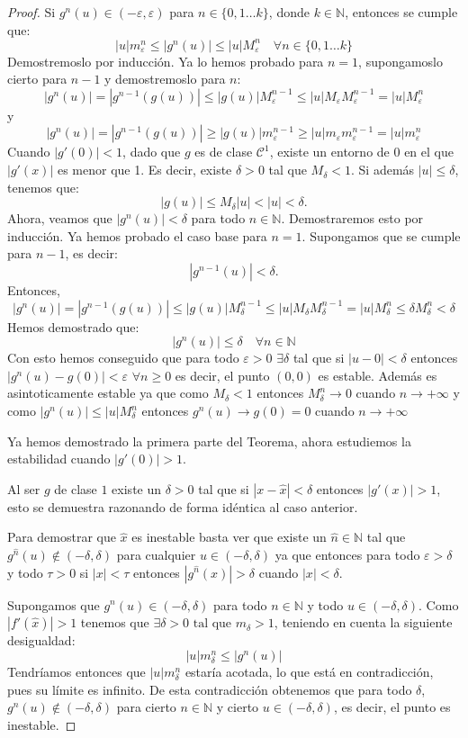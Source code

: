 \documentclass[12pt,a4paper]{report}
\theoremstyle{definition}
\begin{document}
\begin{proof}
Si $g^n(u) \in (-\varepsilon,\varepsilon)$ para $n \in \{0,1 \ldots k\}$, donde $k \in \mathbb{N}$, entonces se cumple que:
$$
|u|  m^n_\varepsilon \leq |g^n(u)| \leq  |u|  M^n_\varepsilon \quad \forall n \in \{0,1 \ldots k\}
$$
%
Demostremoslo por inducción. Ya lo hemos probado para $n = 1$, supongamoslo cierto para $n-1$ y demostremoslo para $n$:
$$|g^n(u)| = |g^{n-1}(g(u))| \leq |g(u)|M_\varepsilon^{n-1} \leq |u|M_\varepsilon M_\varepsilon^{n-1} = |u| M_\varepsilon^{n}$$
y
%
$$|g^n(u)| = |g^{n-1}(g(u))| \geq |g(u)|m_\varepsilon^{n-1} \geq |u|m_\varepsilon m_\varepsilon^{n-1} = |u| m_\varepsilon^{n}$$
%
Cuando \( |g'(0)| < 1 \), dado que \( g \) es de clase \( \mathcal{C}^1 \), existe un entorno de \( 0 \) en el que \( |g'(x)| \) es menor que 1. Es decir, existe \( \delta > 0 \) tal que \( M_\delta < 1 \). Si además \( |u| \leq \delta \), tenemos que:
\[
|g(u)| \leq M_\delta |u| < |u| < \delta.
\]
%
Ahora, veamos que \( |g^n(u)| < \delta \) para todo \( n \in \mathbb{N} \). Demostraremos esto por inducción. Ya hemos probado el caso base para \( n = 1 \). Supongamos que se cumple para \( n - 1 \), es decir:
\[
|g^{n-1}(u)| < \delta.
\]
Entonces,
$$
|g^n(u)|  = |g^{n-1}(g(u))| \leq |g(u)|  M^{n-1}_\delta   \leq |u| M_\delta  M^{n-1}_\delta = |u|  M^{n}_\delta   \leq \delta  M^n_\delta    < \delta
$$
%
Hemos demostrado que:
$$ |g^n(u)| \leq \delta \quad \forall n \in \mathbb{N}$$
%
Con esto hemos conseguido que para todo $\varepsilon  > 0$ $  \exists  \delta  $ tal que si $ |u-0| < \delta $ entonces $ |g^n(u) - g(0)| < \varepsilon$  $ \forall n \geq 0 $ es decir, el punto $(0,0)$ es estable. 
Además es asintoticamente estable ya que como $ M_\delta  < 1$ entonces $ M^n_\delta  \rightarrow 0$ cuando $n \rightarrow +\infty$ y como $|g^n(u)| \leq |u| M^n_\delta   $ entonces $ g^n(u) \rightarrow g(0)=0$ cuando $n \rightarrow +\infty$

Ya hemos demostrado la primera parte del Teorema, ahora estudiemos la estabilidad cuando $|g'(0)| > 1$.

Al ser $g$ de clase $1$ existe un $\delta > 0$ tal que si $|x - \hat{x}| < \delta$ entonces $|g'(x)| > 1$, esto se demuestra razonando de forma idéntica al caso anterior. 

Para demostrar que $\hat{x}$ es inestable basta ver que existe un  $\hat{n} \in \mathbb{N}$ tal que $g^{\hat{n}}(u) \notin (-\delta,\delta)$ para cualquier $u \in (-\delta,\delta)$ ya que entonces para todo $\varepsilon > \delta$ y todo $\tau > 0$ si $|x| < \tau$ entonces $|g^{\hat{n}}(x)| > \delta $ cuando $|x| < \delta$.

Supongamos que $g^n(u) \in (-\delta,\delta)$ para todo $n \in \mathbb{N}$ y todo $u \in (-\delta,\delta)$.
Como $|f'(\hat{x})| > 1$ tenemos que  $ \exists \delta > 0 \text{ tal que } m_\delta > 1$, teniendo en cuenta la siguiente desigualdad:
\[
|u| m^n_\delta \leq |g^n(u)|
\]
%
Tendríamos entonces que $|u|m^n_{\delta}$ estaría acotada, lo que está en contradicción, pues su límite es infinito. De esta contradicción obtenemos que para todo $\delta$, $g^n(u) \notin (-\delta,\delta)$ para cierto $n\in\mathbb{N}$ y cierto $u\in (-\delta,\delta)$, es decir, el punto es inestable.

\end{proof}
\end{document}
